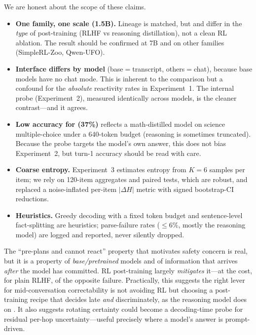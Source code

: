  We are honest about the scope of these claims.
\begin{itemize}[leftmargin=*,itemsep=1pt,topsep=2pt]
    \item \textbf{One family, one scale (1.5B).} Lineage is matched, but \instruct and \rlm
    differ in the \emph{type} of post-training (RLHF vs reasoning distillation), not a clean RL
    ablation. The result should be confirmed at 7B and on other families (\eg SimpleRL-Zoo,
    Qwen-UFO).
    \item \textbf{Interface differs by model} (base$=$transcript, others$=$chat), because base
    models have no chat mode. This is inherent to the comparison but a confound for the
    \emph{absolute} reactivity rates in Experiment~1. The internal probe (Experiment~2),
    measured identically across models, is the cleaner contrast---and it agrees.
    \item \textbf{Low \arc accuracy for \rlm (37\%)} reflects a math-distilled model on science
    multiple-choice under a 640-token budget (reasoning is sometimes truncated). Because the
    probe targets the model's own answer, this does not bias Experiment~2, but turn-1 accuracy
    should be read with care.
    \item \textbf{Coarse entropy.} Experiment~3 estimates entropy from $K=6$ samples per item;
    we rely on 120-item aggregates and paired tests, which are robust, and replaced a
    noise-inflated per-item $|\Delta H|$ metric with signed bootstrap-CI reductions.
    \item \textbf{Heuristics.} Greedy decoding with a fixed token budget and sentence-level
    \strat fact-splitting are heuristics; parse-failure rates ($\leq6\%$, mostly the reasoning
    model) are logged and reported, never silently dropped.
\end{itemize}

 The ``pre-plans and cannot react'' property that motivates
safety concern is real, but it is a property of \emph{base/pretrained} models and of
information that arrives \emph{after} the model has committed. RL post-training largely
\emph{mitigates} it---at the cost, for plain RLHF, of the opposite failure. Practically, this
suggests the right lever for mid-conversation correctability is not avoiding RL but choosing a
post-training recipe that decides late \emph{and} discriminately, as the reasoning model does
on \arc. It also suggests rotating certainty could become a decoding-time probe for residual
per-hop uncertainty---useful precisely where a model's answer is prompt-driven.
